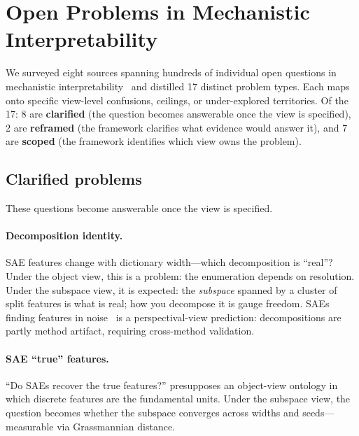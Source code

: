 \documentclass{article}
\begin{document}
\section{Open Problems in Mechanistic Interpretability}\label{app:openprobs}

We surveyed eight sources spanning hundreds of individual open questions
in mechanistic interpretability~\citep{sharkey2025,nanda2022open,
apollo2024,schmidt2026,steinhardt2026,williams2025,mib2025,orgad2026}
and distilled 17 distinct problem types.  Each maps onto specific
view-level confusions, ceilings, or under-explored territories.
Of the 17: 8 are \textbf{clarified} (the question becomes answerable once the
view is specified), 2 are \textbf{reframed} (the framework clarifies what
evidence would answer it), and 7 are \textbf{scoped} (the framework
identifies which view owns the problem).

\subsection{Clarified problems}

These questions become answerable once the view is specified.

\paragraph{Decomposition identity.}
SAE features change with dictionary width---which decomposition is
``real''?  Under the object view, this is a problem: the enumeration
depends on resolution.  Under the subspace view, it is expected: the
\emph{subspace} spanned by a cluster of split features is what is
real; how you decompose it is gauge freedom.  SAEs finding features
in noise~\citep{leask2025} is a perspectival-view prediction:
decompositions are partly method artifact, requiring cross-method
validation.

\paragraph{SAE ``true'' features.}
``Do SAEs recover the true features?'' presupposes an object-view
ontology in which discrete features are the fundamental units.  Under
the subspace view, the question becomes whether the subspace converges
across widths and seeds---measurable via Grassmannian distance.
\end{document}
